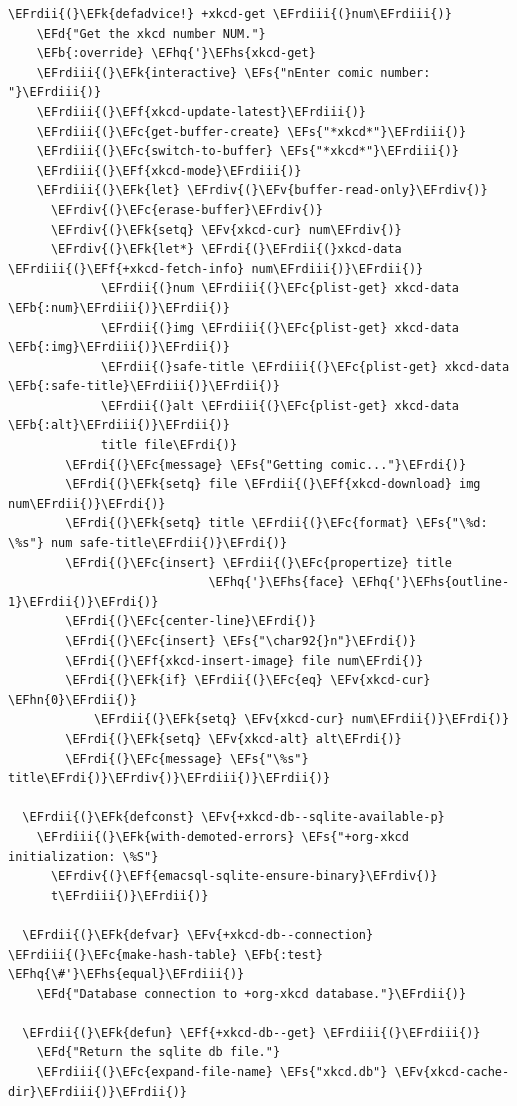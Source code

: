 \documentclass{scrartcl}
\newcommand{\EFk}[1]{\textcolor{EFk}{#1}} %
\newcommand{\EFd}[1]{\textcolor{EFd}{#1}} %
\newcommand{\EFs}[1]{\textcolor{EFs}{#1}} %
\newcommand{\EFb}[1]{\textcolor{EFb}{#1}} %
\newcommand{\EFc}[1]{\textcolor{EFc}{#1}} %
\newcommand{\EFv}[1]{\textcolor{EFv}{#1}} %
\newcommand{\EFf}[1]{\textcolor{EFf}{#1}} %
\newcommand{\EFhn}[1]{#1} %
\newcommand{\EFhq}[1]{#1} %
\newcommand{\EFhs}[1]{#1} %
\newcommand{\EFrdi}[1]{#1} %
\newcommand{\EFrdii}[1]{#1} %
\newcommand{\EFrdiii}[1]{#1} %
\newcommand{\EFrdiv}[1]{#1} %
\begin{document}
\begin{Code}
\begin{Verbatim}[]
  \EFrdii{(}\EFk{defadvice!} +xkcd-get \EFrdiii{(}num\EFrdiii{)}
    \EFd{"Get the xkcd number NUM."}
    \EFb{:override} \EFhq{'}\EFhs{xkcd-get}
    \EFrdiii{(}\EFk{interactive} \EFs{"nEnter comic number: "}\EFrdiii{)}
    \EFrdiii{(}\EFf{xkcd-update-latest}\EFrdiii{)}
    \EFrdiii{(}\EFc{get-buffer-create} \EFs{"*xkcd*"}\EFrdiii{)}
    \EFrdiii{(}\EFc{switch-to-buffer} \EFs{"*xkcd*"}\EFrdiii{)}
    \EFrdiii{(}\EFf{xkcd-mode}\EFrdiii{)}
    \EFrdiii{(}\EFk{let} \EFrdiv{(}\EFv{buffer-read-only}\EFrdiv{)}
      \EFrdiv{(}\EFc{erase-buffer}\EFrdiv{)}
      \EFrdiv{(}\EFk{setq} \EFv{xkcd-cur} num\EFrdiv{)}
      \EFrdiv{(}\EFk{let*} \EFrdi{(}\EFrdii{(}xkcd-data \EFrdiii{(}\EFf{+xkcd-fetch-info} num\EFrdiii{)}\EFrdii{)}
             \EFrdii{(}num \EFrdiii{(}\EFc{plist-get} xkcd-data \EFb{:num}\EFrdiii{)}\EFrdii{)}
             \EFrdii{(}img \EFrdiii{(}\EFc{plist-get} xkcd-data \EFb{:img}\EFrdiii{)}\EFrdii{)}
             \EFrdii{(}safe-title \EFrdiii{(}\EFc{plist-get} xkcd-data \EFb{:safe-title}\EFrdiii{)}\EFrdii{)}
             \EFrdii{(}alt \EFrdiii{(}\EFc{plist-get} xkcd-data \EFb{:alt}\EFrdiii{)}\EFrdii{)}
             title file\EFrdi{)}
        \EFrdi{(}\EFc{message} \EFs{"Getting comic..."}\EFrdi{)}
        \EFrdi{(}\EFk{setq} file \EFrdii{(}\EFf{xkcd-download} img num\EFrdii{)}\EFrdi{)}
        \EFrdi{(}\EFk{setq} title \EFrdii{(}\EFc{format} \EFs{"\%d: \%s"} num safe-title\EFrdii{)}\EFrdi{)}
        \EFrdi{(}\EFc{insert} \EFrdii{(}\EFc{propertize} title
                            \EFhq{'}\EFhs{face} \EFhq{'}\EFhs{outline-1}\EFrdii{)}\EFrdi{)}
        \EFrdi{(}\EFc{center-line}\EFrdi{)}
        \EFrdi{(}\EFc{insert} \EFs{"\char92{}n"}\EFrdi{)}
        \EFrdi{(}\EFf{xkcd-insert-image} file num\EFrdi{)}
        \EFrdi{(}\EFk{if} \EFrdii{(}\EFc{eq} \EFv{xkcd-cur} \EFhn{0}\EFrdii{)}
            \EFrdii{(}\EFk{setq} \EFv{xkcd-cur} num\EFrdii{)}\EFrdi{)}
        \EFrdi{(}\EFk{setq} \EFv{xkcd-alt} alt\EFrdi{)}
        \EFrdi{(}\EFc{message} \EFs{"\%s"} title\EFrdi{)}\EFrdiv{)}\EFrdiii{)}\EFrdii{)}

  \EFrdii{(}\EFk{defconst} \EFv{+xkcd-db--sqlite-available-p}
    \EFrdiii{(}\EFk{with-demoted-errors} \EFs{"+org-xkcd initialization: \%S"}
      \EFrdiv{(}\EFf{emacsql-sqlite-ensure-binary}\EFrdiv{)}
      t\EFrdiii{)}\EFrdii{)}

  \EFrdii{(}\EFk{defvar} \EFv{+xkcd-db--connection} \EFrdiii{(}\EFc{make-hash-table} \EFb{:test} \EFhq{\#'}\EFhs{equal}\EFrdiii{)}
    \EFd{"Database connection to +org-xkcd database."}\EFrdii{)}

  \EFrdii{(}\EFk{defun} \EFf{+xkcd-db--get} \EFrdiii{(}\EFrdiii{)}
    \EFd{"Return the sqlite db file."}
    \EFrdiii{(}\EFc{expand-file-name} \EFs{"xkcd.db"} \EFv{xkcd-cache-dir}\EFrdiii{)}\EFrdii{)}


\end{Verbatim}
\end{Code}
\end{document}
